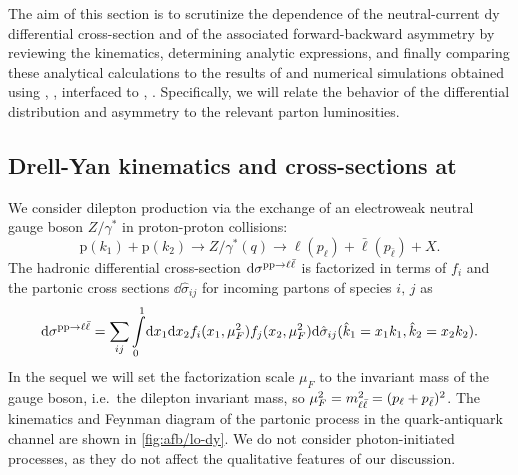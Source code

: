 
The aim of this  section is to scrutinize the \pdf dependence of the
neutral-current \acrlong{dy} differential cross-section and of the associated
forward-backward asymmetry by reviewing the \lo kinematics, determining \lo
analytic expressions, and finally comparing these analytical calculations to
the results of \lo and \nlo  numerical simulations obtained using \mgamc,
\cite{Alwall:2014hca}, interfaced to \pineappl,
\cite{Carrazza:2020gss,christopher_schwan_2022_7023438}.
%
Specifically, we will relate the behavior of the differential distribution and
asymmetry to the relevant parton luminosities.

\subsection{Drell-Yan kinematics and cross-sections at \lo}
\label{sec:afb/dylo}

We consider dilepton production via the exchange of an electroweak neutral
gauge boson $Z/\gamma^*$ in proton-proton collisions:
\begin{equation}
  \label{eq:afb/DYprocess}
  \mathrm{p}(k_1) + \mathrm{p}(k_2) \to Z/\gamma^*(q) \to \ell(p_{\ell}) + \bar{\ell}(p_{\bar{\ell}}) + X \text{.}
\end{equation}
The hadronic differential cross-section $\dd\sigma^{\mathrm{p}\mathrm{p}\to\ell\bar{\ell}}$  is factorized in
terms of \pdfs $f_i$ and the partonic cross sections
$\dd\hat\sigma_{ij}$ for incoming partons of species $i,\,j$ as
\begin{equation}
  \dd\sigma^{\mathrm{p}\mathrm{p}\to\ell\bar{\ell}} = \sum_{ij} \int\limits_0^1\!\dd x_1 \dd
  x_2 f_i(x_1,\mu_F^2) f_j(x_2,\mu_F^2) \dd\hat\sigma_{ij}(\hat k_1 = x_1
  k_1, \hat k_2 = x_2 k_2).
  \label{eq:afb/factorization}
\end{equation}
In the sequel we will set the  factorization scale $\mu_F$ to the
invariant mass of the gauge boson, i.e.\ the dilepton
invariant mass, so $\mu^2_F = m_{\ell\bar{\ell}}^2=(p_\ell + p_{\bar{\ell}})^2$.
%
The kinematics and Feynman diagram of the \lo partonic process
in the quark-antiquark channel are shown in \cref{fig:afb/lo-dy}.
We do not consider photon-initiated processes, as they do not affect
the qualitative features of our discussion.



